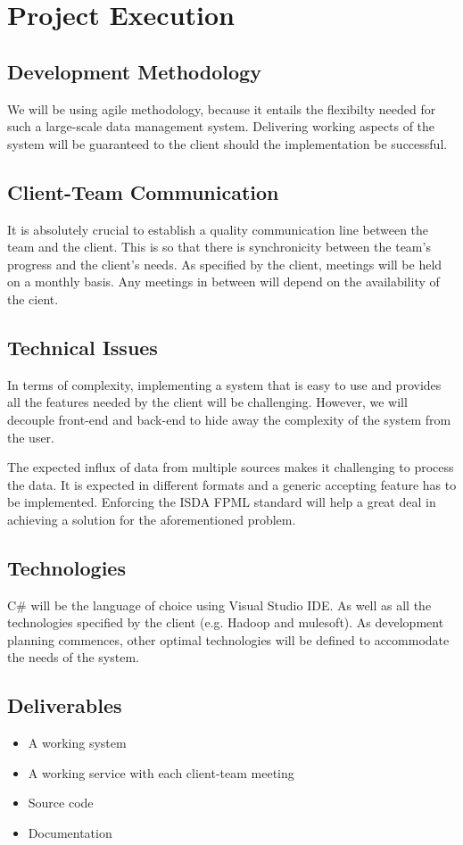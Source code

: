 \documentclass[12pt]{article}
\begin{document}


\newpage
\tableofcontents

\newpage



\newpage

\section{Project Execution}
\subsection{Development Methodology}
	\par{We will be using agile methodology, because it entails the flexibilty needed for such a large-scale data management system. Delivering working aspects of the system will be guaranteed to the client should the implementation be successful.}
\subsection{Client-Team Communication}
	\par{It is absolutely crucial to establish a quality communication line between the team and the client. This is so that there is synchronicity between the team's progress and the client's needs. As specified by the client, meetings will be held on a monthly basis. Any meetings in between will depend on the availability of the cient.}
\subsection{Technical Issues}
	\par{In terms of complexity, implementing a system that is easy to use and provides all the features needed by the client will be challenging. However, we will decouple front-end and back-end to hide away the complexity of the system from the user.}
	\par{The expected influx of data from multiple sources makes it challenging to process the data. It is expected in different formats and a generic accepting feature has to be implemented. Enforcing the ISDA FPML standard will help a great deal in achieving a solution for the aforementioned problem.}
\subsection{Technologies}
	\par{C\# will be the language of choice using Visual Studio IDE. As well as all the technologies specified by the client (e.g. Hadoop and mulesoft). As development planning commences, other optimal technologies will be defined to accommodate the needs of the system.}
\subsection{Deliverables}
	\begin{itemize}
		\item A working system
		\item A working service with each client-team meeting
		\item Source code
		\item Documentation
	\end{itemize}
\end{document}
